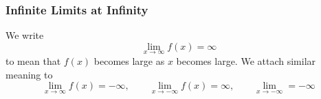 \begin{frame}
\frametitle{Infinite Limits at Infinity}
We write
\[
\lim_{x\rightarrow \infty}f(x) = \infty
\]
to mean that $f(x)$ becomes large as $x$ becomes large.  We attach similar meaning to
\[
\lim_{x\to\infty}f(x) = -\infty , \qquad \lim_{x\to - \infty}f(x) = \infty, \qquad \lim_{x\to - \infty} = -\infty
\]
\end{frame}
